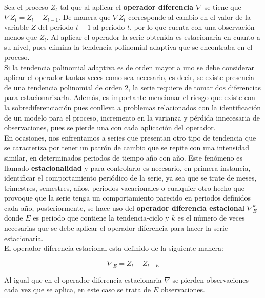 Sea el proceso $Z_t$ tal que al aplicar el \textbf{operador diferencia $\nabla$ } se tiene que  $\nabla Z_t=Z_t-Z_{t-1}$. De manera que $\nabla Z_t$ corresponde al cambio en el valor de la variable $Z$ del periodo $t-1$ al periodo $t$, por lo que cuenta con una observación menos que $Z_t$. Al aplicar el operador la serie obtenida es estacionaria en cuanto a su nivel, pues elimina la tendencia polinomial adaptiva que se encontraba en el proceso. \\

Si la tendencia polinomial adaptiva es de orden mayor a uno se debe considerar aplicar el operador tantas veces como sea necesario, es decir, se existe presencia de una tendencia polinomial de orden $2$, la serie requiere de tomar dos diferencias para estacionarizarla. Además, es importante mencionar el riesgo que existe con la sobrediferenciación pues conlleva a problemas relacionados con la identificación de un modelo para el proceso, incremento en la varianza y p\'erdida innecesaria de observaciones, pues se pierde una con cada aplicación del operador.\\

En ocasiones, nos enfrentamos a series que presentan otro tipo de tendencia que se caracteriza por tener un patrón de cambio que se repite con una intensidad similar, en determinados periodos de tiempo a\~no con a\~no. Este fenómeno es llamado \textbf{estacionalidad} y para controlarlo es necesario, en primera instancia, identificar el comportamiento periódico de la serie, ya sea que se trate de meses, trimestres, semestres, años, periodos vacacionales o cualquier otro hecho que provoque que la serie tenga un comportamiento parecido  en periodos definidos cada a\~no, posteriormente, se hace uso del \textbf{ operador diferencia estacional}  $\nabla_{E}^{k}$  donde $E$ es periodo que contiene la tendencia-ciclo y $k$ es el número de veces necesarias que se debe aplicar el operador diferencia para hacer la serie estacionaria.\\

El operador diferencia estacional esta definido de la siguiente manera:

\begin{equation}
\nabla_{E}=Z_t-Z_{t-E}
\end {equation}

Al igual que en el operador diferencia estacionaria $\nabla$ se pierden observaciones cada vez que se aplica, en este caso se trata de $E$ observaciones.\\

